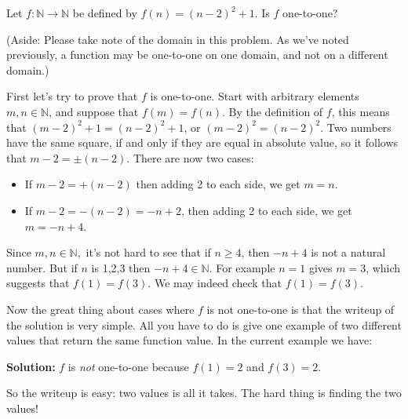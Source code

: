 \begin{example}{}
Let $f\colon \mathbb{N} \to \mathbb{N}$ be defined by $f(n)=(n-2)^2 + 1$.  Is $f$ one-to-one?

\noindent(Aside: Please take note of the domain in this problem. As we've noted previously,  a function may be one-to-one on one domain, and not on a different domain.)

First let's try to prove that $f$ is one-to-one.   
Start with arbitrary elements $m, n \in \mathbb{N}$, and suppose that $f(m)=f(n)$.  By the definition of $f$, this means that $(m-2)^2 + 1=(n-2)^2 + 1$, or $(m-2)^2 =(n-2)^2 $.  Two numbers have the same square, if and only if they are equal in absolute value, so it follows that $m-2 = \pm (n-2)$.  There are now two cases:
\begin{itemize}
\item
If $m-2=+(n-2)$ then adding 2 to each side, we get $m=n$.  
\item
If $m-2 = -(n-2) = -n+2$, then adding 2 to each side, we get $m=-n+4$.  
\end{itemize}
Since $m,n \in \mathbb{N},$ it's not hard to see that if $n \ge 4$, then $-n+4$ is not a natural number.  But if $n$ is 1,2,3 then $-n+4 \in \mathbb{N}$. For example $n=1$ gives $m = 3$, which suggests that $f(1) = f(3)$. We may indeed check that  $f(1) = f(3)$. 

Now the great thing about cases where $f$ is not one-to-one is that  the writeup of the solution is very simple. All you have to do is give one example of two different values that return the same function value. In the current example we have: 
\medskip

{\bf Solution:} $f$ is \emph{not} one-to-one because $f(1) = 2$ and $f(3) = 2$. 
\medskip

\noindent  
So the writeup is easy: two values is all it takes. The hard thing is finding the two values!
\end{example}


